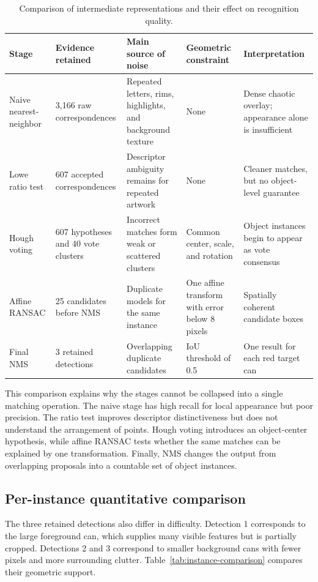 \documentclass[10pt,twocolumn]{article}
\begin{document}
\begin{table}[t]
\centering
\caption{Comparison of intermediate representations and their effect on recognition quality.}
\label{tab:stage-comparison}
\small
\begin{tabular}{p{}p{}p{}p{}p{}}
\toprule
Stage & Evidence retained & Main source of noise & Geometric constraint & Interpretation\\
\midrule
Naive nearest-neighbor & 3,166 raw correspondences & Repeated letters, rims, highlights, and background texture & None & Dense chaotic overlay; appearance alone is insufficient\\
Lowe ratio test & 607 accepted correspondences & Descriptor ambiguity remains for repeated artwork & None & Cleaner matches, but no object-level guarantee\\
Hough voting & 607 hypotheses and 40 vote clusters & Incorrect matches form weak or scattered clusters & Common center, scale, and rotation & Object instances begin to appear as vote consensus\\
Affine RANSAC & 25 candidates before NMS & Duplicate models for the same instance & One affine transform with error below 8 pixels & Spatially coherent candidate boxes\\
Final NMS & 3 retained detections & Overlapping duplicate candidates & IoU threshold of 0.5 & One result for each red target can\\
\bottomrule
\end{tabular}
\end{table}

This comparison explains why the stages cannot be collapsed into a single matching operation. The naive stage has high recall for local appearance but poor precision. The ratio test improves descriptor distinctiveness but does not understand the arrangement of points. Hough voting introduces an object-center hypothesis, while affine RANSAC tests whether the same matches can be explained by one transformation. Finally, NMS changes the output from overlapping proposals into a countable set of object instances.

\subsection{Per-instance quantitative comparison}
The three retained detections also differ in difficulty. Detection 1 corresponds to the large foreground can, which supplies many visible features but is partially cropped. Detections 2 and 3 correspond to smaller background cans with fewer pixels and more surrounding clutter. Table~\ref{tab:instance-comparison} compares their geometric support.
\end{document}
